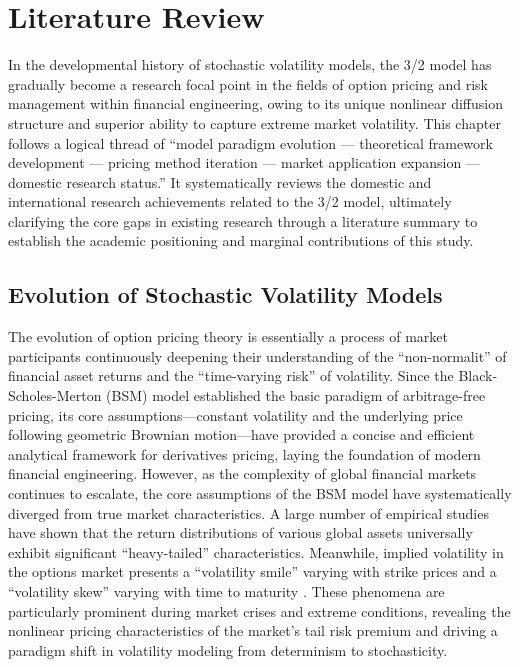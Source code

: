 \chapter{Literature Review}

In the developmental history of stochastic volatility models, the 3/2 model has gradually become a research focal point in the fields of option pricing and risk management within financial engineering, owing to its unique nonlinear diffusion structure and superior ability to capture extreme market volatility. This chapter follows a logical thread of ``model paradigm evolution — theoretical framework development — pricing method iteration — market application expansion — domestic research status.'' It systematically reviews the domestic and international research achievements related to the 3/2 model, ultimately clarifying the core gaps in existing research through a literature summary to establish the academic positioning and marginal contributions of this study.

\section{Evolution of Stochastic Volatility Models}

The evolution of option pricing theory is essentially a process of market participants continuously deepening their understanding of the ``non-normalit'' of financial asset returns and the ``time-varying risk'' of volatility. Since the Black-Scholes-Merton (BSM) model \citet{blackPricingOptionsCorporate1973,mertonTheoryRationalOption1973} established the basic paradigm of arbitrage-free pricing, its core assumptions—constant volatility and the underlying price following geometric Brownian motion—have provided a concise and efficient analytical framework for derivatives pricing, laying the foundation of modern financial engineering. However, as the complexity of global financial markets continues to escalate, the core assumptions of the BSM model have systematically diverged from true market characteristics. A large number of empirical studies have shown that the return distributions of various global assets universally exhibit significant ``heavy-tailed'' characteristics. Meanwhile, implied volatility in the options market presents a ``volatility smile'' varying with strike prices and a ``volatility skew'' varying with time to maturity \citet{rubinsteinNonparametricTestsAlternative1985}. These phenomena are particularly prominent during market crises and extreme conditions, revealing the nonlinear pricing characteristics of the market's tail risk premium and driving a paradigm shift in volatility modeling from determinism to stochasticity.

